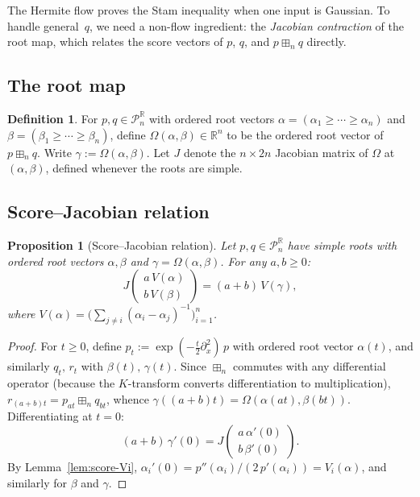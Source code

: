 \documentclass[11pt,a4paper]{amsart}
\theoremstyle{plain}
\newtheorem{proposition}[theorem]{Proposition}
\theoremstyle{definition}
\newtheorem{definition}[theorem]{Definition}
\theoremstyle{remark}
\newcommand{\R}{\mathbb{R}}
\newcommand{\PnR}[1][n]{\mathcal{P}^{\R}_{#1}}
\newcommand{\fp}{\boxplus_n}
\begin{document}
The Hermite flow proves the Stam inequality when one input
is Gaussian.
To handle general~$q$, we need a non-flow ingredient:
the \emph{Jacobian contraction} of the root map, which
relates the score vectors of $p$, $q$, and $p\fp q$
directly.

\subsection{The root map}

\begin{definition}\label{def:root-map}
For $p,q\in\PnR$ with ordered root vectors
$\alpha=(\alpha_1\ge\cdots\ge\alpha_n)$ and
$\beta=(\beta_1\ge\cdots\ge\beta_n)$, define
$\Omega(\alpha,\beta)\in\R^n$ to be the ordered root
vector of $p\fp q$.
Write $\gamma:=\Omega(\alpha,\beta)$.
Let $J$ denote the $n\times 2n$ Jacobian matrix of
$\Omega$ at $(\alpha,\beta)$, defined whenever the roots
are simple.
\end{definition}

\subsection{Score--Jacobian relation}

\begin{proposition}[Score--Jacobian relation]
\label{prop:score-jac}
Let $p,q\in\PnR$ have simple roots with ordered root
vectors $\alpha,\beta$ and
$\gamma=\Omega(\alpha,\beta)$.
For any $a,b\ge 0$:
\begin{equation}\label{eq:score-jac}
  J\begin{pmatrix}a\,V(\alpha)\\b\,V(\beta)\end{pmatrix}
  =(a+b)\,V(\gamma),
\end{equation}
where $V(\alpha)
=\bigl(\sum_{j\ne i}(\alpha_i-\alpha_j)^{-1}\bigr)_{i=1}^n$.
\end{proposition}

\begin{proof}
For $t\ge 0$, define
$p_t:=\exp(-\tfrac{t}{2}\partial_x^2)\,p$
with ordered root vector $\alpha(t)$, and similarly
$q_t,\,r_t$ with $\beta(t),\,\gamma(t)$.
Since $\fp$ commutes with any differential operator
(because the $K$-transform converts differentiation
to multiplication),
$r_{(a+b)t}=p_{at}\fp q_{bt}$, whence
$\gamma((a+b)t)=\Omega(\alpha(at),\beta(bt))$.
Differentiating at $t=0$:
\[
  (a+b)\,\gamma'(0)
  =J\begin{pmatrix}a\,\alpha'(0)\\b\,\beta'(0)
  \end{pmatrix}.
\]
By Lemma~\ref{lem:score-Vi},
$\alpha_i'(0)=p''(\alpha_i)/(2\,p'(\alpha_i))=V_i(\alpha)$,
and similarly for $\beta$ and $\gamma$.
\end{proof}
\end{document}
